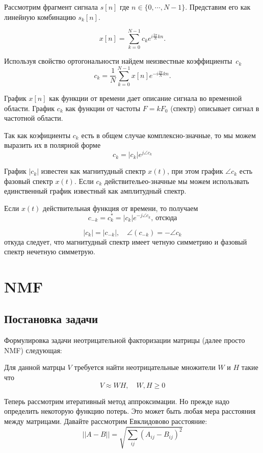 \documentclass[oneside, final, 12pt]{extarticle}
\begin{document}
  Рассмотрим фрагмент сигнала $s[n]$ где $n \in \{0,\cdots,N-1\}$.
  Представим его как линейную комбинацию $s_k[n]$.

  \[
    x[n] = \sum_{k=0}^{N-1} c_k e^{i\tfrac{2\pi}{N}kn}.
  \]

  Используя свойство ортогональности найдем неизвестные коэффициенты~$c_k$
  \[
    c_k = \dfrac{1}{N} \sum_{k=0}^{N-1} x[n] e^{-i\tfrac{2\pi}{N}kn}.
  \]

  График $x[n]$ как функции от времени дает описание сигнала во временной
  области. График $c_k$ как функции от частоты $F = k F_0$ (спектр)
  описывает сигнал в частотной области.

  Так как коэфициенты $c_k$ есть в общем случае комплексно-значные,
  то мы можем выразить их в полярной форме
  \[
    c_k = |c_k| e^{j\angle c_k}
  \]

  График $|c_k|$ известен как магнитудный спектр $x(t)$,
  при этом график $\angle c_k$ есть фазовый спектр $x(t)$.
  Если $c_k$ действительео-значные мы можем использвать единственный
  график известный как амплитудный спектр.

  Если $x(t)$ действительная функция от времени, то получаем
  \[
    c_{-k} = c_k^* = |c_k| e^{-j\angle c_k} \text{, отсюда}
  \]

  \[
    |c_k| = |c_{-k}|, \quad \angle (c_{-k}) = -\angle c_k
  \]
  откуда следует, что магнитудный спектр имеет четную симметрию
  и фазовый спектр нечетную симметрую.

\cleardoublepage

\section{NMF}

\subsection{Постановка задачи}

Формулировка задачи неотрицательной факторизации матрицы (далее просто NMF)
следующая:

Для данной матрцы $V$ требуется найти неотрицательные множители $W$ и $H$
такие что
\[
  V \approx WH, \quad W,H \geqslant 0
\]

Теперь рассмотрим итеративный метод аппроксимации.
Но прежде надо определить некоторую функцию потерь.
Это может быть любая мера расстояния между матрицами.
Давайте рассмотрим Евклидовово расстояние:
\[
  ||A - B|| = \sqrt{\sum_{ij} (A_{ij} - B_{ij})^2}
\]
\end{document}
